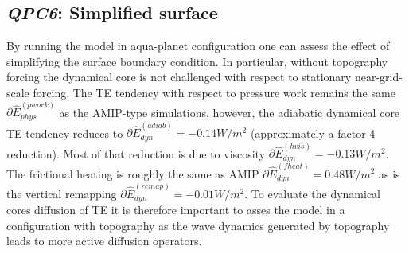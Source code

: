 \documentclass{agujournal}
\newcommand*{\gi}[1]{\widehat{#1}}
\begin{document}


\subsection{{\em{QPC6}}: Simplified surface}\label{sec:QPC6}
By running the model in aqua-planet configuration one can assess the effect of simplifying the surface boundary condition. In particular, without topography forcing the dynamical core is not challenged with respect to stationary near-grid-scale forcing. The TE tendency with respect to pressure work remains the same $\partial \gi{E}_{phys}^{({pwork})}$ as the AMIP-type simulations, however, the adiabatic dynamical core TE tendency reduces to $\partial \gi{E}_{dyn}^{({adiab})}=-0.14 W/m^2$ (approximately a factor 4 reduction). Most of that reduction is due to viscosity $\partial \gi{E}_{dyn}^{(hvis)}=-0.13 W/m^2$. The frictional heating is roughly the same as AMIP $\partial \gi{E}_{dyn}^{(fheat)}=0.48 W/m^2$ as is the vertical remapping  $\partial \gi{E}_{dyn}^{(remap)}=-0.01 W/m^2$. To evaluate the dynamical cores diffusion of TE it is therefore important to asses the model in a configuration with topography as the wave dynamics generated by topography leads to more active diffusion operators.
\end{document}
